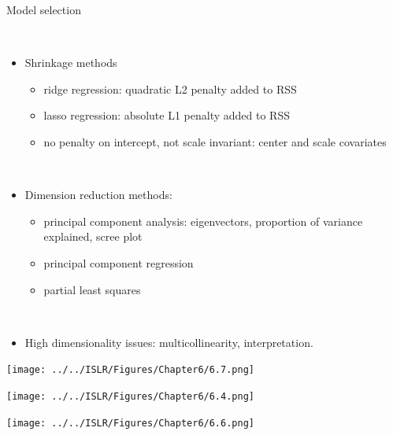 \documentclass[10pt,ignorenonframetext,]{beamer}
\providecommand{\tightlist}{%
  \setlength{\itemsep}{0pt}\setlength{\parskip}{0pt}}
\begin{document}
\begin{frame}

\begin{block}{Model selection}

\(~\)

\begin{itemize}
\item
  Shrinkage methods

  \begin{itemize}
  \tightlist
  \item
    ridge regression: quadratic L2 penalty added to RSS
  \item
    lasso regression: absolute L1 penalty added to RSS
  \item
    no penalty on intercept, not scale invariant: center and scale
    covariates
  \end{itemize}

  \(~\)
\item
  Dimension reduction methods:

  \begin{itemize}
  \tightlist
  \item
    principal component analysis: eigenvectors, proportion of variance
    explained, scree plot
  \item
    principal component regression
  \item
    partial least squares
  \end{itemize}

  \(~\)
\item
  High dimensionality issues: multicollinearity, interpretation.
\end{itemize}

\end{block}

\end{frame}

\begin{frame}

\texttt{[image: ../../ISLR/Figures/Chapter6/6.7.png]}

\end{frame}

\begin{frame}

\texttt{[image: ../../ISLR/Figures/Chapter6/6.4.png]}

\end{frame}

\begin{frame}

\texttt{[image: ../../ISLR/Figures/Chapter6/6.6.png]}

\end{frame}
\end{document}
